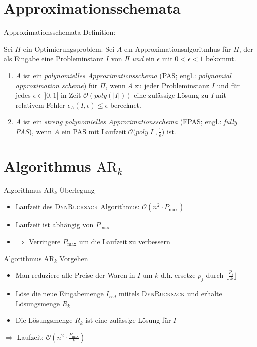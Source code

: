 \section{Approximationsschemata}

\begin{frame}{Approximationsschemata}	
    Definition:
			
Sei $\Pi$ ein Optimierungsproblem. Sei $A$ ein Approximationsalgoritmhus für $\Pi$, der als Eingabe eine Probleminstanz $I$ von $\Pi$ \textit{und} ein $\epsilon$ mit $0 < \epsilon < 1$ bekommt.

\begin{enumerate}
\item
$A$ ist ein \textit{polynomielles Approximationsschema} (PAS; engl.: \textit{polynomial approximation scheme}) für $\Pi$, wenn \textit{A} zu jeder Probleminstanz $I$ und für jedes $\epsilon \in ] 0,1 [$ in Zeit $\mathcal O(poly(|I|))$ eine zulässige Lösung zu \textit{I} mit relativem Fehler $\epsilon_A(\textit{I},\epsilon) \leqslant \epsilon$ berechnet.

\item
$A$ ist ein \textit{streng polynomielles Approximationsschema} (FPAS; engl.: \textit{fully PAS}), wenn $A$ ein PAS mit Laufzeit $\mathcal O(poly|I|, \frac{1}{\epsilon}$) ist.

\end{enumerate}		      
\end{frame}

\section{Algorithmus $\text{AR}_k$}
\begin{frame}{Algorithmus $\text{AR}_k$ Überlegung}	
	\begin{itemize}
		\item 
		Laufzeit des \textsc{DynRucksack} Algorithmus: $\mathcal O(n^2 \cdot P_{\max})$ 
		\item
		Laufzeit ist abhängig von $P_{\max}$
		\item
		$\Rightarrow$ Verringere $P_{\max}$ um die Laufzeit zu verbessern
	\end{itemize}
\end{frame}
\begin{frame}{Algorithmus $\text{AR}_k$ Vorgehen}	
	\begin{itemize}
		\item 
		Man reduziere alle Preise der Waren in $I$ um $k$ d.h. ersetze $p_j$ durch $\displaystyle \lfloor \frac {p_j}{k} \rfloor $
		\item
		Löse die neue Eingabemenge $I_{red}$ mittels \textsc{DynRucksack} und erhalte Lösungsmenge $R_k$
		\item
		Die Lösungsmenge $R_k$ ist eine zulässige Lösung für $I$
		
	\end{itemize}
	$\Rightarrow$ Laufzeit: $\displaystyle \mathcal O(n^2 \cdot \frac{P_{\max}}{k})$
\end{frame}

